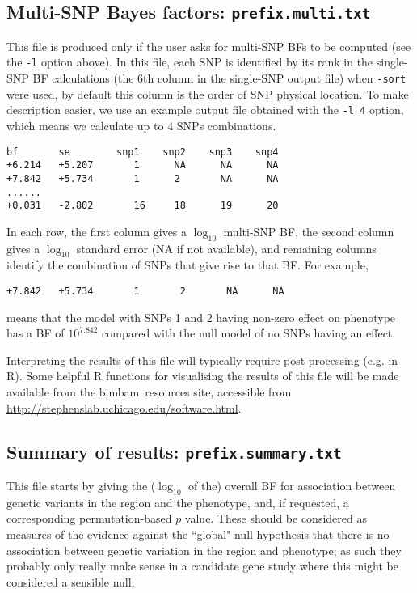 \documentclass[11pt,Palatino]{article}
\def\bimbam{{\sc bimbam}~}
\begin{document}
\subsection{Multi-SNP Bayes factors: {\tt prefix.multi.txt}}

This file is produced only if the user asks for multi-SNP BFs to be computed (see the {\tt -l} option above).  In this file, each SNP is identified
by its rank in the single-SNP BF calculations (the 6th column in the single-SNP output file) when {\tt -sort} were used, by default this column is the order of SNP physical location.  To make description easier, we use an example output file obtained with the {\tt -l 4} option, which means we calculate up to $4$ SNPs combinations.  

\begin{verbatim}
bf       se        snp1    snp2    snp3    snp4
+6.214   +5.207       1      NA      NA      NA
+7.842   +5.734       1      2       NA      NA
......
+0.031   -2.802       16     18      19      20
\end{verbatim}

In each row, the first column gives a $\log_{10}$ multi-SNP BF, the second column gives a $\log_{10}$ standard error (NA if not available), and remaining columns identify the combination of SNPs that give rise to that BF.
For example,
\begin{verbatim}
+7.842   +5.734       1       2       NA      NA
\end{verbatim}
means that the model with SNPs 1 and 2 having non-zero effect on phenotype has
a BF of $10^{7.842}$ compared with the null model of no SNPs having an effect.

Interpreting the results of this file will typically require post-processing (e.g. in R).
Some helpful R functions for visualising the results of this file will be made available from the \bimbam resources site,
accessible from \url{http://stephenslab.uchicago.edu/software.html}.

\subsection{Summary of results: {\tt prefix.summary.txt}}

This file starts by giving the ($\log_{10}$ of the) overall BF for association between genetic variants in the region
and the phenotype, and, if requested, a corresponding permutation-based $p$ value.
These should be considered as measures of the evidence against the ``global" null hypothesis
that there is no association between genetic variation in the region and phenotype; as such they
probably only really make sense in a candidate gene study where this might be considered a sensible null.
\end{document}
